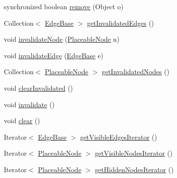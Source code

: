 \begin{DoxyCompactItemize}
\item 
synchronized boolean \hyperlink{classorg_1_1tzi_1_1use_1_1gui_1_1views_1_1diagrams_1_1_diagram_graph_a5fcdf58b607e14e34ecaf631b884ed1b}{remove} (Object o)
\item 
Collection$<$ \hyperlink{classorg_1_1tzi_1_1use_1_1gui_1_1views_1_1diagrams_1_1elements_1_1edges_1_1_edge_base}{Edge\-Base} $>$ \hyperlink{classorg_1_1tzi_1_1use_1_1gui_1_1views_1_1diagrams_1_1_diagram_graph_a4c5deb6274615d9fc68b6ca6ec178dd8}{get\-Invalidated\-Edges} ()
\item 
void \hyperlink{classorg_1_1tzi_1_1use_1_1gui_1_1views_1_1diagrams_1_1_diagram_graph_afd9ef4870905c70d87e3093de4637bc6}{invalidate\-Node} (\hyperlink{classorg_1_1tzi_1_1use_1_1gui_1_1views_1_1diagrams_1_1elements_1_1_placeable_node}{Placeable\-Node} n)
\item 
void \hyperlink{classorg_1_1tzi_1_1use_1_1gui_1_1views_1_1diagrams_1_1_diagram_graph_ab694c6253f478213e9592f2347201eba}{invalidate\-Edge} (\hyperlink{classorg_1_1tzi_1_1use_1_1gui_1_1views_1_1diagrams_1_1elements_1_1edges_1_1_edge_base}{Edge\-Base} e)
\item 
Collection$<$ \hyperlink{classorg_1_1tzi_1_1use_1_1gui_1_1views_1_1diagrams_1_1elements_1_1_placeable_node}{Placeable\-Node} $>$ \hyperlink{classorg_1_1tzi_1_1use_1_1gui_1_1views_1_1diagrams_1_1_diagram_graph_a42bb621deff392186dc979b1b9825117}{get\-Invalidated\-Nodes} ()
\item 
void \hyperlink{classorg_1_1tzi_1_1use_1_1gui_1_1views_1_1diagrams_1_1_diagram_graph_a2d6326c14b2b5675f00cc8df4233b350}{clear\-Invalidated} ()
\item 
void \hyperlink{classorg_1_1tzi_1_1use_1_1gui_1_1views_1_1diagrams_1_1_diagram_graph_ae6e2d2c46a3738283129f8147960e6a8}{invalidate} ()
\item 
void \hyperlink{classorg_1_1tzi_1_1use_1_1gui_1_1views_1_1diagrams_1_1_diagram_graph_afbd8a8439c001381c93aca4d863035bc}{clear} ()
\item 
Iterator$<$ \hyperlink{classorg_1_1tzi_1_1use_1_1gui_1_1views_1_1diagrams_1_1elements_1_1edges_1_1_edge_base}{Edge\-Base} $>$ \hyperlink{classorg_1_1tzi_1_1use_1_1gui_1_1views_1_1diagrams_1_1_diagram_graph_a77bd8eef6322d67e4274778b72ade99f}{get\-Visible\-Edges\-Iterator} ()
\item 
Iterator$<$ \hyperlink{classorg_1_1tzi_1_1use_1_1gui_1_1views_1_1diagrams_1_1elements_1_1_placeable_node}{Placeable\-Node} $>$ \hyperlink{classorg_1_1tzi_1_1use_1_1gui_1_1views_1_1diagrams_1_1_diagram_graph_a0ed253a0fc706362a7e63cf15cf7ecc6}{get\-Visible\-Nodes\-Iterator} ()
\item 
Iterator$<$ \hyperlink{classorg_1_1tzi_1_1use_1_1gui_1_1views_1_1diagrams_1_1elements_1_1_placeable_node}{Placeable\-Node} $>$ \hyperlink{classorg_1_1tzi_1_1use_1_1gui_1_1views_1_1diagrams_1_1_diagram_graph_a8b78dd3e5edfd46d71dbd92b27fa7ba9}{get\-Hidden\-Nodes\-Iterator} ()
\end{DoxyCompactItemize}
